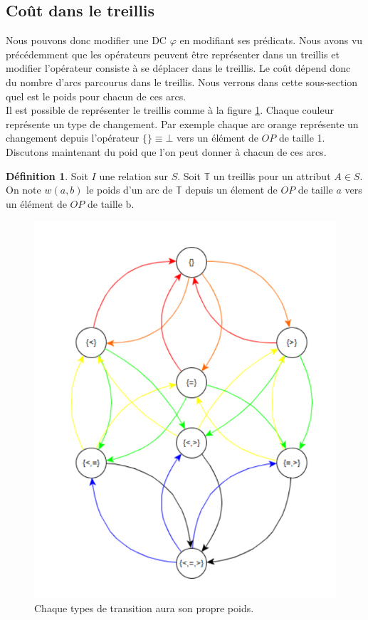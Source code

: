 \documentclass[letterpaper, 12pt]{report}
\theoremstyle{definition}
\newtheorem{mydef}{Définition}
\begin{document}

\subsection{Coût dans le treillis}

Nous pouvons donc modifier une DC $\varphi$ en modifiant ses prédicats. Nous avons vu précédemment que les opérateurs peuvent être représenter dans un treillis et modifier l'opérateur consiste à se déplacer dans le treillis. Le coût dépend donc du nombre d'arcs parcourus dans le treillis. Nous verrons dans cette sous-section quel est le poids pour chacun de ces arcs.\\

Il est possible de représenter le treillis comme à la figure \ref{treillisGraph}. Chaque couleur représente un type de changement. Par exemple chaque arc orange représente un changement depuis l'opérateur $\{ \} \equiv \bot$ vers un élément de $OP$ de taille 1. Discutons maintenant du poid que l'on peut donner à chacun de ces arcs.

\begin{mydef}

	Soit $I$ une relation sur $S$. Soit $\mathbb{T}$ un treillis pour un attribut $A \in S$. On note $w(a,b)$ le poids d'un arc de $\mathbb{T}$ depuis un élement de $OP$ de taille $a$ vers un élément de $OP$ de taille b.

\end{mydef}


\begin{figure}
	\centering
	\includegraphics[scale=0.655]{img/treillisGraph}
	\caption{\label{treillisGraph} Chaque types de transition aura son propre poids.}
\end{figure}
\end{document}
